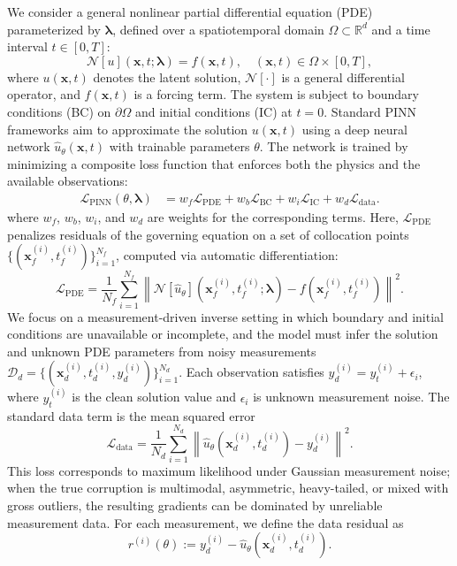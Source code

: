 \documentclass{article}
\theoremstyle{plain}
\theoremstyle{definition}
\theoremstyle{remark}
\begin{document}
We consider a general nonlinear partial differential equation (PDE) parameterized by $\boldsymbol{\lambda}$, defined over a spatiotemporal domain $\Omega \subset \mathbb{R}^d$ and a time interval $t \in [0, T]$:
\begin{equation}
    \mathcal{N}[u](\mathbf{x},t;\boldsymbol{\lambda}) = f(\mathbf{x},t), \quad (\mathbf{x},t) \in \Omega \times [0, T] ,
\end{equation}
where $u(\mathbf{x},t)$ denotes the latent solution, $\mathcal{N}[\cdot]$ is a general differential operator, and $f(\mathbf{x},t)$ is a forcing term. The system is subject to boundary conditions (BC) on $\partial \Omega$ and initial conditions (IC) at $t=0$.
Standard PINN frameworks aim to approximate the solution $u(\mathbf{x},t)$ using a deep neural network $\hat{u}_{\theta}(\mathbf{x},t)$ with trainable parameters $\theta$. The network is trained by minimizing a composite loss function that enforces both the physics and the available observations:
\begin{equation}
\begin{aligned}
\mathcal{L}_\mathrm{PINN}(\theta, \boldsymbol{\lambda})
&= w_f \mathcal{L}_\mathrm{PDE} + w_b \mathcal{L}_\mathrm{BC} + w_i \mathcal{L}_\mathrm{IC} + w_d \mathcal{L}_\mathrm{data}.
\end{aligned}
\label{eq:standard_pinn}
\end{equation}
where $w_f$, $w_b$, $w_i$, and $w_d$ are weights for the corresponding terms. Here, $\mathcal{L}_\mathrm{PDE}$ penalizes residuals of the governing equation on a set of collocation points $\{ ( \mathbf{x}_f^{(i)}, t_f^{(i)} ) \}_{i=1}^{N_f}$, computed via automatic differentiation:
\begin{equation}
    \mathcal{L}_\mathrm{PDE} = \frac{1}{N_f} \sum _{i=1} ^{N_f} \left\| \mathcal{N}[\hat{u}_\theta] (\mathbf{x}_f^{(i)}, t_f^{(i)}; \boldsymbol{\lambda}) - f(\mathbf{x}_f^{(i)}, t_f^{(i)}) \right\|^2 .
\label{eq:pde_loss}
\end{equation}
We focus on a measurement-driven inverse setting in which boundary and initial conditions are unavailable or incomplete, and the model must infer the solution and unknown PDE parameters from noisy measurements $\mathcal{D}_d=\{(\mathbf{x}_d^{(i)},t_d^{(i)},y_d^{(i)})\}_{i=1}^{N_d}$. Each observation satisfies $y_d^{(i)}=y_t^{(i)}+\epsilon_i$, where $y_t^{(i)}$ is the clean solution value and $\epsilon_i$ is unknown measurement noise. The standard data term is the mean squared error
\begin{equation}
\mathcal{L}_\mathrm{data}
= \frac{1}{N_d} \sum_{i=1}^{N_d}
\left\| \hat{u}_\theta(\mathbf{x}_d^{(i)}, t_d^{(i)}) - y_d^{(i)} \right\|^2 .
\label{eq:data_loss}
\end{equation}
This loss corresponds to maximum likelihood under Gaussian measurement noise; when the true corruption is multimodal, asymmetric, heavy-tailed, or mixed with gross outliers, the resulting gradients can be dominated by unreliable measurement data. For each measurement, we define the data residual as
\begin{equation}
r^{(i)}(\theta) := y_d^{(i)} - \hat{u}_\theta(\mathbf{x}_d^{(i)},t_d^{(i)}).
\label{eq:residual_def}
\end{equation}
\end{document}
